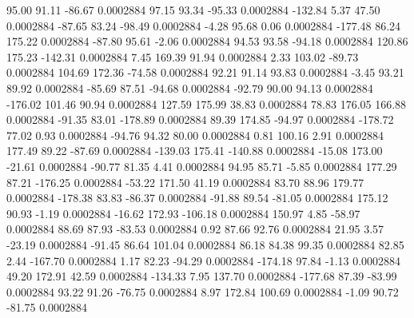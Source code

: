        95.00       91.11      -86.67     0.0002884
       97.15       93.34      -95.33     0.0002884
     -132.84        5.37       47.50     0.0002884
      -87.65       83.24      -98.49     0.0002884
       -4.28       95.68        0.06     0.0002884
     -177.48       86.24      175.22     0.0002884
      -87.80       95.61       -2.06     0.0002884
       94.53       93.58      -94.18     0.0002884
      120.86      175.23     -142.31     0.0002884
        7.45      169.39       91.94     0.0002884
        2.33      103.02      -89.73     0.0002884
      104.69      172.36      -74.58     0.0002884
       92.21       91.14       93.83     0.0002884
       -3.45       93.21       89.92     0.0002884
      -85.69       87.51      -94.68     0.0002884
      -92.79       90.00       94.13     0.0002884
     -176.02      101.46       90.94     0.0002884
      127.59      175.99       38.83     0.0002884
       78.83      176.05      166.88     0.0002884
      -91.35       83.01     -178.89     0.0002884
       89.39      174.85      -94.97     0.0002884
     -178.72       77.02        0.93     0.0002884
      -94.76       94.32       80.00     0.0002884
        0.81      100.16        2.91     0.0002884
      177.49       89.22      -87.69     0.0002884
     -139.03      175.41     -140.88     0.0002884
      -15.08      173.00      -21.61     0.0002884
      -90.77       81.35        4.41     0.0002884
       94.95       85.71       -5.85     0.0002884
      177.29       87.21     -176.25     0.0002884
      -53.22      171.50       41.19     0.0002884
       83.70       88.96      179.77     0.0002884
     -178.38       83.83      -86.37     0.0002884
      -91.88       89.54      -81.05     0.0002884
      175.12       90.93       -1.19     0.0002884
      -16.62      172.93     -106.18     0.0002884
      150.97        4.85      -58.97     0.0002884
       88.69       87.93      -83.53     0.0002884
        0.92       87.66       92.76     0.0002884
       21.95        3.57      -23.19     0.0002884
      -91.45       86.64      101.04     0.0002884
       86.18       84.38       99.35     0.0002884
       82.85        2.44     -167.70     0.0002884
        1.17       82.23      -94.29     0.0002884
     -174.18       97.84       -1.13     0.0002884
       49.20      172.91       42.59     0.0002884
     -134.33        7.95      137.70     0.0002884
     -177.68       87.39      -83.99     0.0002884
       93.22       91.26      -76.75     0.0002884
        8.97      172.84      100.69     0.0002884
       -1.09       90.72      -81.75     0.0002884
